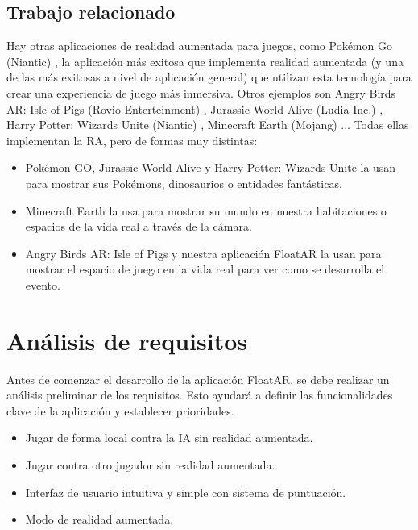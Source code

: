 \documentclass[a4paper, openright, 12pt]{article}
\begin{document}
\subsection{Trabajo relacionado}
Hay otras aplicaciones de realidad aumentada para juegos, como Pokémon Go (Niantic) \cite{PokemonGO}, la aplicación más exitosa que implementa realidad aumentada (y una de las más exitosas a nivel de aplicación general) que utilizan esta tecnología para crear una experiencia de juego más inmersiva. Otros ejemplos son Angry Birds AR: Isle of Pigs (Rovio Enterteinment) \cite{AngryBirds}, Jurassic World Alive (Ludia Inc.) \cite{JurassicWorld}, Harry Potter: Wizards Unite (Niantic) \cite{HarryPotter}, Minecraft Earth (Mojang) \cite{MinecraftEarth}... Todas ellas implementan la RA, pero de formas muy distintas:
\begin{itemize}
    \item Pokémon GO, Jurassic World Alive y Harry Potter: Wizards Unite la usan para mostrar sus Pokémons, dinosaurios o entidades fantásticas.
    \item Minecraft Earth la usa para mostrar su mundo en nuestra habitaciones o espacios de la vida real a través de la cámara.
    \item Angry Birds AR: Isle of Pigs y nuestra aplicación FloatAR la usan para mostrar el espacio de juego en la vida real para ver como se desarrolla el evento.
\end{itemize}

\section{Análisis de requisitos}
Antes de comenzar el desarrollo de la aplicación FloatAR, se debe realizar un análisis preliminar de los requisitos. Esto ayudará a definir las funcionalidades clave de la aplicación y establecer prioridades.
\begin{itemize}
    \item Jugar de forma local contra la IA sin realidad aumentada.
    \item Jugar contra otro jugador sin realidad aumentada.
    \item Interfaz de usuario intuitiva y simple con sistema de puntuación.
    \item Modo de realidad aumentada.
\end{itemize}
\end{document}
